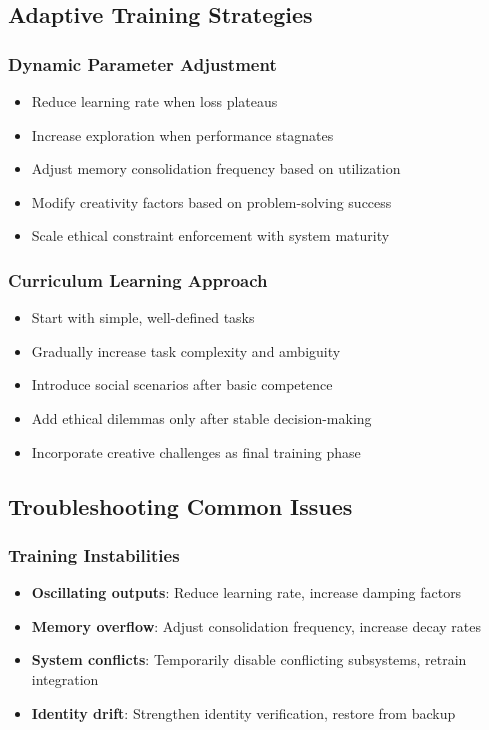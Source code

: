 \documentclass[11pt,a4paper]{article}
\begin{document}
\subsection{Adaptive Training Strategies}

\subsubsection{Dynamic Parameter Adjustment}
\begin{itemize}[leftmargin=0.5in]
    \item Reduce learning rate when loss plateaus
    \item Increase exploration when performance stagnates
    \item Adjust memory consolidation frequency based on utilization
    \item Modify creativity factors based on problem-solving success
    \item Scale ethical constraint enforcement with system maturity
\end{itemize}

\subsubsection{Curriculum Learning Approach}
\begin{itemize}[leftmargin=0.5in]
    \item Start with simple, well-defined tasks
    \item Gradually increase task complexity and ambiguity
    \item Introduce social scenarios after basic competence
    \item Add ethical dilemmas only after stable decision-making
    \item Incorporate creative challenges as final training phase
\end{itemize}

\subsection{Troubleshooting Common Issues}

\subsubsection{Training Instabilities}
\begin{itemize}[leftmargin=0.5in]
    \item \textbf{Oscillating outputs}: Reduce learning rate, increase 
    damping factors
    \item \textbf{Memory overflow}: Adjust consolidation frequency, 
    increase decay rates
    \item \textbf{System conflicts}: Temporarily disable conflicting 
    subsystems, retrain integration
    \item \textbf{Identity drift}: Strengthen identity verification, 
    restore from backup
\end{itemize}
\end{document}
